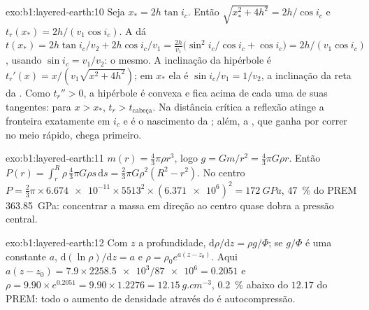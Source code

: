 \begin{solution}{exo:b1:layered-earth:10}
Seja $x_* = 2h\tan i_c$. Então $\sqrt{x_*^2 + 4h^2} = 2h/\cos i_c$ e
$t_r(x_*) = 2h/(v_1\cos i_c)$. A  dá
$t(x_*) = 2h\tan i_c/v_2 + 2h\cos i_c/v_1 = \frac{2h}{v_1}\bigl(\sin^2 i_c/\cos
i_c + \cos i_c\bigr) = 2h/(v_1\cos i_c)$, usando $\sin i_c = v_1/v_2$: o mesmo.
A inclinação da hipérbole é $t_r'(x) = x/(v_1\sqrt{x^2 + 4h^2})$; em $x_*$ ela é
$\sin i_c/v_1 = 1/v_2$, a inclinação da reta da . Como
$t_r'' > 0$, a hipérbole é convexa e fica acima de cada uma de suas tangentes: para
$x > x_*$, $t_r > t_{\text{cabeça}}$. Na distância crítica a reflexão
atinge a fronteira exatamente em $i_c$ e é o nascimento da ; além,
a , que ganha por correr no meio rápido, chega primeiro.
\end{solution}

\begin{solution}{exo:b1:layered-earth:11}
$m(r) = \tfrac43\pi\rho r^3$, logo $g = Gm/r^2 = \tfrac43\pi G\rho r$. Então
$P(r) = \int_r^R \rho\,\tfrac43\pi G\rho s\,\mathrm ds = \tfrac23\pi G\rho^2(R^2
- r^2)$. No centro $P = \tfrac23\pi\times\num{6.674e-11}\times5513^2\times
(\num{6.371e6})^2 = \qty{172}{GPa}$, \qty{47}{\percent} do PREM
\qty{363.85}{GPa}: concentrar a massa em direção ao centro quase dobra
a pressão central.
\end{solution}

\begin{solution}{exo:b1:layered-earth:12}
Com $z$ a profundidade, $\mathrm d\rho/\mathrm dz = \rho g/\Phi$; se $g/\Phi$ é uma
constante $a$, $\mathrm d(\ln\rho)/\mathrm dz = a$ e $\rho = \rho_0
e^{a(z - z_0)}$. Aqui $a(z - z_0) = 7.9\times\num{2258.5e3}/\num{87e6} =
0.2051$ e $\rho = 9.90\times e^{0.2051} = 9.90\times1.2276 =
\qty{12.15}{g.cm^{-3}}$, \qty{0.2}{\percent} abaixo do $12.17$ do PREM: todo o
aumento de densidade através do  é autocompressão.
\end{solution}


